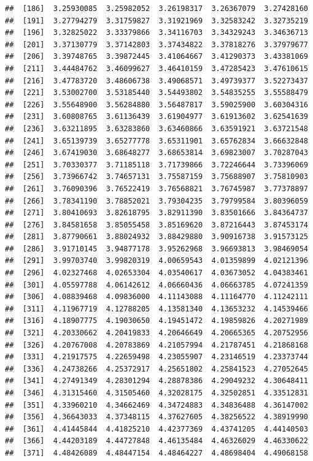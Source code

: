 \documentclass[
  11pt]{report}
\begin{document}
\begin{itemize}
\begin{verbatim}
##  [186]  3.25930085  3.25982052  3.26198317  3.26367079  3.27428160
##  [191]  3.27794279  3.31759827  3.31921969  3.32583242  3.32735219
##  [196]  3.32825022  3.33379866  3.34116703  3.34329243  3.34636713
##  [201]  3.37130779  3.37142803  3.37434822  3.37818276  3.37979677
##  [206]  3.39748765  3.39872445  3.41064667  3.41290373  3.43381069
##  [211]  3.44484762  3.46099627  3.46410159  3.47285423  3.47610615
##  [216]  3.47783720  3.48606738  3.49068571  3.49739377  3.52273437
##  [221]  3.53002700  3.53185440  3.54493802  3.54835255  3.55588479
##  [226]  3.55648900  3.56284880  3.56487817  3.59025900  3.60304316
##  [231]  3.60808765  3.61136439  3.61904977  3.61913602  3.62541639
##  [236]  3.63211895  3.63283860  3.63460866  3.63591921  3.63721548
##  [241]  3.65139739  3.65277778  3.65311901  3.65762834  3.66632848
##  [246]  3.67419030  3.68648277  3.68653814  3.69823007  3.70287043
##  [251]  3.70330377  3.71185118  3.71739866  3.72246644  3.73396069
##  [256]  3.73966742  3.74657131  3.75587159  3.75688907  3.75810903
##  [261]  3.76090396  3.76522419  3.76568821  3.76745987  3.77378897
##  [266]  3.78341190  3.78852021  3.79304235  3.79799584  3.80396059
##  [271]  3.80410693  3.82618795  3.82911390  3.83501666  3.84364737
##  [276]  3.84581658  3.85055458  3.85169620  3.87216443  3.87453174
##  [281]  3.87790661  3.88024932  3.88429880  3.90916738  3.91573125
##  [286]  3.91710145  3.94877178  3.95262968  3.96693813  3.98469054
##  [291]  3.99703740  3.99820319  4.00659543  4.01359899  4.02121396
##  [296]  4.02327468  4.02653304  4.03540617  4.03673052  4.04383461
##  [301]  4.05597788  4.06142612  4.06660436  4.06663785  4.07241359
##  [306]  4.08839468  4.09836000  4.11143088  4.11164770  4.11242111
##  [311]  4.11967719  4.12788205  4.13581340  4.13653232  4.14539466
##  [316]  4.18907775  4.19030650  4.19451472  4.19859826  4.20271989
##  [321]  4.20330662  4.20419833  4.20646649  4.20665365  4.20752956
##  [326]  4.20767008  4.20783869  4.21057994  4.21787451  4.21868168
##  [331]  4.21917575  4.22659498  4.23055907  4.23146519  4.23373744
##  [336]  4.24738266  4.25372917  4.25651802  4.25841523  4.27052645
##  [341]  4.27491349  4.28301294  4.28878386  4.29049232  4.30648411
##  [346]  4.31315460  4.31505460  4.32028175  4.32502851  4.33512831
##  [351]  4.33960210  4.34662469  4.34724883  4.34836488  4.36147002
##  [356]  4.36643033  4.37348115  4.37627605  4.38256522  4.38919990
##  [361]  4.41445844  4.41825210  4.42377369  4.43741205  4.44140503
##  [366]  4.44203189  4.44727848  4.46135484  4.46326029  4.46330622
##  [371]  4.48426089  4.48447154  4.48464227  4.48698404  4.49068158

\end{verbatim}
\end{itemize}
\end{document}
